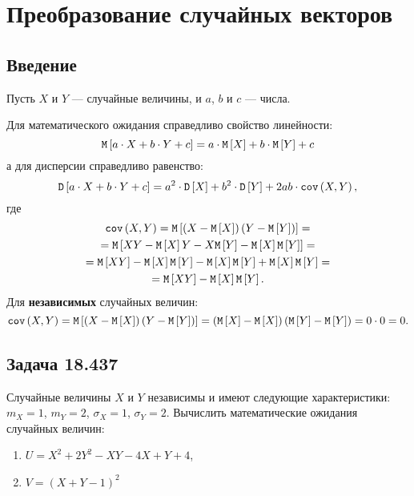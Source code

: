 \chapter{Преобразование случайных векторов}

\section*{Введение}
Пусть $X$ и $Y$ --- случайные величины, и $a$, $b$ и $c$ --- числа.

Для математического ожидания справедливо свойство линейности:
\begin{equation}
    \mathtt{M} \left [ a \cdot X + b \cdot Y + c \right ]
    = a \cdot \mathtt{M} \left [ X \right ] + b \cdot \mathtt{M} \left [ Y \right ] + c
\end{equation}
а для дисперсии справедливо равенство:
\begin{equation}
    \mathtt{D} \left [ a \cdot X + b \cdot Y + c \right ]
    = a^2 \cdot \mathtt{D} \left [ X \right ] + b^2 \cdot \mathtt{D} \left [ Y \right ] + 2 a b \cdot \texttt{cov} \left ( X , Y \right ),
\end{equation}
где
\begin{multline}
    \label{10:covariance}
    \texttt{cov} \left ( X , Y \right )
    = \mathtt{M} \left [ \left ( X - \mathtt{M} \left [ X \right ] \right ) \left ( Y - \mathtt{M} \left [ Y \right ] \right ) \right ] = \\
    = \mathtt{M} \left [  X Y - \mathtt{M} \left [ X \right ] Y - X \mathtt{M} \left [ Y \right ] - \mathtt{M} \left [ X \right ] \mathtt{M} \left [ Y \right ] \right ] = \\
    = \mathtt{M} \left [ XY \right ] - \mathtt{M} \left [ X \right ] \mathtt{M} \left [ Y \right ] - \mathtt{M} \left [ X \right ] \mathtt{M} \left [ Y \right ] + \mathtt{M} \left [ X \right ] \mathtt{M} \left [ Y \right ] = \\
    = \mathtt{M} \left [ XY \right ] - \mathtt{M} \left [ X \right ] \mathtt{M} \left [ Y \right ].
\end{multline}
Для \textbf{независимых} случайных величин:
\begin{equation}
    \texttt{cov} \left ( X , Y \right )
    = \mathtt{M} \left [ \left ( X - \mathtt{M} \left [ X \right ] \right ) \left ( Y - \mathtt{M} \left [ Y \right ] \right ) \right ]
    = \left ( \mathtt{M} \left [ X \right ] - \mathtt{M} \left [ X \right ] \right ) \left ( \mathtt{M} \left [ Y \right ] - \mathtt{M} \left [ Y \right ] \right )
    = 0 \cdot 0
    = 0 .
\end{equation}

\section*{Задача 18.437}

Случайные величины $X$ и $Y$ независимы и имеют следующие характеристики: $m_X = 1$, $m_Y = 2$, $\sigma_X = 1$, $\sigma_Y = 2$.
Вычислить математические ожидания случайных величин:
\begin{enumerate}
    \item $U = X^2 + 2 Y^2 - XY - 4X + Y + 4$,
    \item $V = (X + Y - 1)^2$
\end{enumerate}

